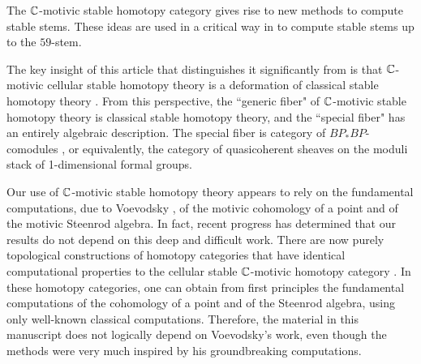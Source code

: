 The $\mathbb{C}$-motivic stable homotopy category
gives rise to new methods to compute stable stems.
These ideas are used in a critical way in \cite{Isaksen14c} to compute stable stems up to the $59$-stem.

The key insight of this article that distinguishes it
significantly from \cite{Isaksen14c} is that $\mathbb{C}$-motivic 
cellular stable homotopy theory is a deformation of classical stable
homotopy theory \cite{GWX18}.  
From this perspective, the ``generic fiber" of
$\mathbb{C}$-motivic stable homotopy theory is classical stable homotopy theory,
and the ``special fiber"
has an entirely algebraic description.  The special fiber is
   category of $BP_*BP$-comodules \cite{Hovey}, or equivalently,
the  
category of quasicoherent sheaves on the moduli stack of 
1-dimensional formal groups.


Our use of $\mathbb{C}$-motivic stable homotopy theory appears to rely on
the fundamental computations, due to Voevodsky \cite{Voevodsky03b} \cite{Voevodsky10},
of the motivic cohomology of a point and of the motivic Steenrod
algebra.  
In fact, recent progress has determined that 
our results do not depend on this deep and difficult work.
There are now purely topological constructions of homotopy
categories that have identical computational properties to
the cellular stable $\mathbb{C}$-motivic homotopy category
\cite{GIKR18} \cite{Pstragowski18}.
In these homotopy categories, one can obtain from first principles
the fundamental computations of the cohomology of a point and
of the Steenrod algebra, using only well-known classical computations.
Therefore,
the material in this manuscript does not logically
depend on Voevodsky's work, even though the methods were very much
inspired by his groundbreaking computations.

